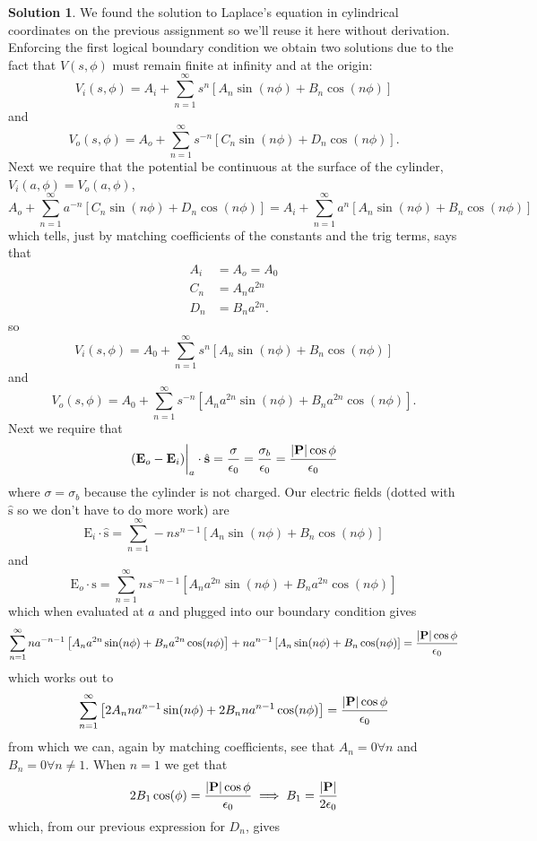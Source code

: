 \documentclass[10pt]{article}
\theoremstyle{definition}
\newtheorem{soln}{Solution}
\newcommand{\uv}[1]{\hat{\bv{{#1}}}}
\newcommand{\bv}[1]{\bm{\mathrm{#1}}}
\begin{document}
\begin{soln}

  We found the solution to Laplace's equation in cylindrical coordinates on the previous assignment so we'll reuse it here without derivation.
  Enforcing the first logical boundary condition we obtain two solutions due to the fact that $V(s,\phi)$ must remain finite at infinity
  and at the origin:
  $$V_{i}(s,\phi)=A_{i}+\sum_{n=1}^{\infty}s^n\left[A_n\sin(n\phi)+B_n\cos(n\phi)\right]$$
  and
  $$V_{o}(s,\phi)=A_o+\sum_{n=1}^{\infty}s^{-n}\left[C_n\sin(n\phi)+D_n\cos(n\phi)\right].$$
  Next we require that the potential be continuous at the surface of the cylinder, $V_i(a,\phi)=V_o(a,\phi)$,
  $$A_o+\sum_{n=1}^{\infty}a^{-n}\left[C_n\sin(n\phi)+D_n\cos(n\phi)\right]=A_{i}+\sum_{n=1}^{\infty}a^n\left[A_n\sin(n\phi)+B_n\cos(n\phi)\right]$$
  which tells, just by matching coefficients of the constants and the trig terms, says that
  \begin{align*}
    A_i & =A_o=A_0    \\
    C_n & =A_na^{2n}  \\
    D_n & =B_na^{2n}.
  \end{align*}
  so
  $$V_i(s,\phi)=A_0+\sum_{n=1}^{\infty}s^n\left[A_n\sin(n\phi)+B_n\cos(n\phi)\right]$$
  and
  $$V_{o}(s,\phi)=A_0+\sum_{n=1}^{\infty}s^{-n}\left[A_na^{2n}\sin(n\phi)+B_na^{2n}\cos(n\phi)\right].$$
  Next we require that
  $$\eval{(\bv{E}_o-\bv{E}_i)}_{a}\cdot\uv{s}=\frac{\sigma}{\epsilon_0}=\frac{\sigma_b}{\epsilon_0}=\frac{\abs{\bv{P}}\cos\phi}{\epsilon_0}$$
  where $\sigma=\sigma_b$ because the cylinder is not charged. Our electric fields (dotted with $\uv{s}$ so we don't have to do more work) are
  $$\bv{E}_i\cdot\uv{s}=\sum_{n=1}^{\infty}-ns^{n-1}\left[A_n\sin(n\phi)+B_n\cos(n\phi)\right]$$
  and
  $$\bv{E}_o\cdot\uv{s}=\sum_{n=1}^{\infty}ns^{-n-1}\left[A_na^{2n}\sin(n\phi)+B_na^{2n}\cos(n\phi)\right]$$
  which when evaluated at $a$ and plugged into our boundary condition gives
  $$\sum_{n=1}^{\infty}na^{-n-1}\left[A_na^{2n}\sin(n\phi)+B_na^{2n}\cos(n\phi)\right]+na^{n-1}\left[A_n\sin(n\phi)+B_n\cos(n\phi)\right]=\frac{\abs{\bv{P}}\cos\phi}{\epsilon_0}$$
  which works out to
  $$\sum_{n=1}^{\infty}\left[2A_nna^{n-1}\sin(n\phi)+2B_nna^{n-1}\cos(n\phi)\right]=\frac{\abs{\bv{P}}\cos\phi}{\epsilon_0}$$
  from which we can, again by matching coefficients, see that $A_n=0\forall n$ and $B_n=0\forall n\neq 1$.
  When $n=1$ we get that
  $$2B_1\cos(\phi)=\frac{\abs{\bv{P}}\cos\phi}{\epsilon_0}\implies B_1=\frac{\abs{\bv{P}}}{2\epsilon_0}$$
  which, from our previous expression for $D_n$, gives

\end{soln}
\end{document}
